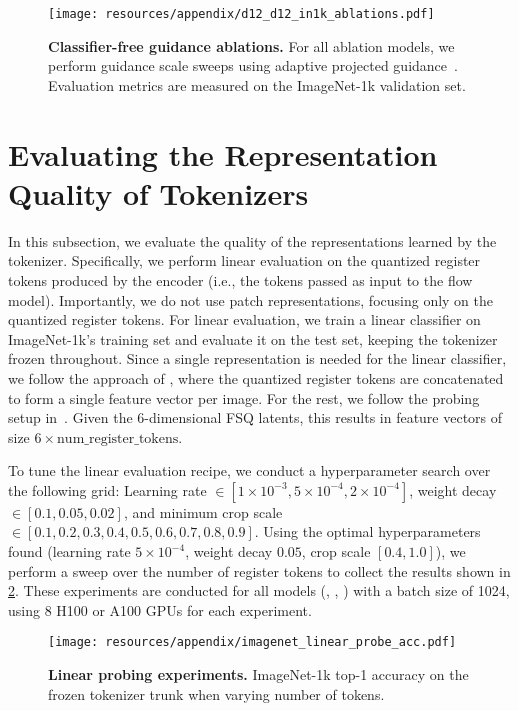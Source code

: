\begin{figure}[ht!]
\centering
\texttt{[image: resources/appendix/d12\_d12\_in1k\_ablations.pdf]}
\caption{
\textbf{Classifier-free guidance ablations.} For all ablation models, we perform guidance scale sweeps using adaptive projected guidance~\cite{Sadat2024NormGuidance}. Evaluation metrics are measured on the ImageNet-1k validation set. 
}
\label{fig:app_flextok_norm_guidance_in1k_albations}
\end{figure}


\clearpage

\section{Evaluating the Representation Quality of \ours Tokenizers}
\label{sec:app_probing}

In this subsection, we evaluate the quality of the representations learned by the \ours tokenizer. Specifically, we perform linear evaluation on the quantized register tokens produced by the \ours encoder (i.e., the tokens passed as input to the flow model). Importantly, we do not use patch representations, focusing only on the quantized register tokens. For linear evaluation, we train a linear classifier on ImageNet-1k's training set and evaluate it on the test set, keeping the tokenizer frozen throughout. Since a single representation is needed for the linear classifier, we follow the approach of \citet{yu2024titok}, where the quantized register tokens are concatenated to form a single feature vector per image. For the rest, we follow the probing setup in~\citet{fini2024multimodal}. Given the 6-dimensional FSQ latents, this results in feature vectors of size $6 \times \text{num\_register\_tokens}$.

To tune the linear evaluation recipe, we conduct a hyperparameter search over the following grid: Learning rate $\in [1 \times 10^{-3}, 5 \times 10^{-4}, 2 \times 10^{-4}]$, weight decay $\in [0.1, 0.05, 0.02]$, and minimum crop scale $\in [0.1, 0.2, 0.3, 0.4, 0.5, 0.6, 0.7, 0.8, 0.9]$. Using the optimal hyperparameters found (learning rate $5 \times 10^{-4}$, weight decay $0.05$, crop scale $[0.4, 1.0]$), we perform a sweep over the number of register tokens to collect the results shown in \cref{fig:app_probing}. These experiments are conducted for all models (\oursbase, \ourslarge, \oursxlarge) with a batch size of 1024, using 8 H100 or A100 GPUs for each experiment.

\begin{figure}[ht!]
\centering
\texttt{[image: resources/appendix/imagenet\_linear\_probe\_acc.pdf]}
\caption{\textbf{Linear probing experiments.} ImageNet-1k top-1 accuracy on the frozen tokenizer trunk when varying number of tokens.}
\label{fig:app_probing}
\end{figure}

